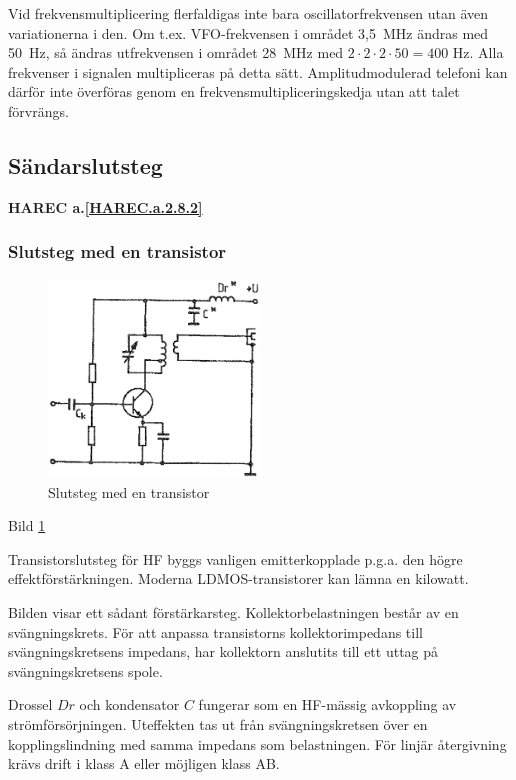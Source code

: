 Vid frekvensmultiplicering flerfaldigas inte bara oscillatorfrekvensen utan
även variationerna i den.
Om t.ex. VFO-frekvensen i området 3,5~MHz ändras med 50~Hz, så ändras
utfrekvensen i området 28~MHz med \(2 \cdot 2 \cdot 2 \cdot 50 = 400\) Hz.
Alla frekvenser i signalen multipliceras på detta sätt.
Amplitudmodulerad telefoni kan därför inte överföras genom en
frekvensmultipliceringskedja utan att talet förvrängs.

\subsection{Sändarslutsteg}
\textbf{HAREC a.\ref{HAREC.a.2.8.2}\label{myHAREC.a.2.8.2}}

\subsubsection{Slutsteg med en transistor}

\begin{figure}
\includegraphics[width=0.5\textwidth]{images/cropped_pdfs/bild_2_3-48.pdf}
\caption{Slutsteg med en transistor}
\label{fig:BildII3-48}
\end{figure}

Bild \ref{fig:BildII3-48}

Transistorslutsteg för HF byggs vanligen emitterkopplade p.g.a. den
högre effektförstärkningen.
Moderna LDMOS-transistorer kan lämna en kilowatt.

Bilden visar ett sådant förstärkarsteg. Kollektorbelastningen består
av en svängningskrets.
För att anpassa transistorns kollektorimpedans till svängningskretsens
impedans, har kollektorn anslutits till ett uttag på svängningskretsens spole.

Drossel \(Dr\) och kondensator \(C\) fungerar som en HF-mässig
avkoppling av strömförsörjningen. Uteffekten tas ut från
svängningskretsen över en kopplingslindning med samma impedans som
belastningen.
För linjär återgivning krävs drift i klass A eller möjligen klass AB.

